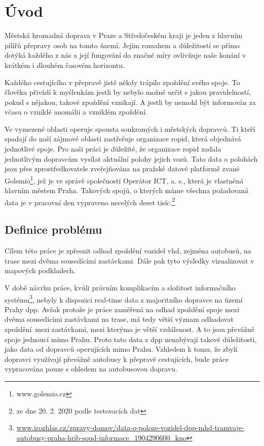 \chapter*{Úvod}

Městská hromadná doprava v Praze a Středočeském kraji je jeden z hlavním pilířů přepravy osob na tomto území. Jejím rozsahem a důležitostí se přímo dotýká každého z nás a její fungování do značné míry ovlivňuje naše konání v krátkém i dlouhém časovém horizontu.

\bigbreak

Každého cestujícího v přepravě jistě někdy trápilo zpoždění svého spoje. To člověka přivádí k myšlenkám jestli by nebylo možné určit s jakou pravidelností, pokud s nějakou, takové zpoždění vznikají. A jestli by nemohl být informován za včasu o vzniklé anomálii a vzniklém zpoždění.

\bigbreak

Ve vymezené oblasti operuje spousta soukromých i městských dopravců. Ti kteří spadají do naší zájmové oblasti zastřešuje organizace \gls{ropid}, která objednává jednotlivé spoje. Pro naši práci je důležité, že organizace \gls{ropid} zadala jednotlivým dopravcům vysílat aktuální polohy jejich vozů. Tato data o polohách jsou přes zprostředkovatele zveřejňována na pražské datové platformě zvané Golemio\footnote{www.golemio.cz}, jež je ve správě společností Operátor ICT, a. s., která je vlastněná hlavním městem Praha. Takových spojů, o kterých máme všechna požadovaná data je v pracovní den vypraveno necelých deset tisíc.\footnote{ze dne 20. 2. 2020 podle testovacích dat}

\section*{Definice problému}

Cílem této práce je zpřesnit odhad zpoždění vozidel \gls{vhd}, zejména autobusů, na trase mezi dvěma sousedícími zastávkami. Dále pak tyto výsledky vizualizovat v mapových podkladech.


\bigbreak

V době návrhu práce, kvůli právním komplikacím a složitost informačního systému\footnote{\url{www.irozhlas.cz/zpravy-domov/data-o-poloze-vozidel-dpp-mhd-tramvaje-autobusy-praha-hrib-soud-informace_1904290600_kno}}, nebyly k dispozici real-time data z majoritního dopravce na území Prahy \gls{dpp}. Avšak protože je práce zaměřená na odhad zpoždění spoje mezi dvěma sousedícími zastávkami na trase, má tedy větší význam odhadovat zpoždění mezi zastávkami, mezi kterýma je větší vzdálenost. A to jsou převážně spoje jednoucí mimo Prahu. Proto tato data z \gls{dpp} nenabývají takové důležitosti, jako data od dopravců operujících mimo Prahu. Vzhledem k tomu, že zbylí dopravci využívají převážně autobusy k přepravě cestujících, bude práce vypracována pouze s ohledem na autobusovou dopravu.

